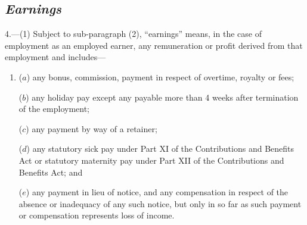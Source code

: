 \documentclass[12pt,a4paper]{article}
\begin{document}
\subsection*{\itshape Earnings}

4.---(1)  Subject to sub-paragraph (2), “earnings” means, in the case of employment as an employed earner, any remuneration or profit derived from that employment and includes—
\begin{enumerate}\item[]
($a$) any bonus, commission, payment in respect of overtime, royalty or fees;

($b$) any holiday pay except any payable more than 4 weeks after termination of the employment;

($c$) any payment by way of a retainer;

($d$) any statutory sick pay under Part XI of the Contributions and Benefits Act or statutory maternity pay under Part XII of the Contributions and Benefits Act; and

($e$) any payment in lieu of notice, and any compensation in respect of the absence or inadequacy of any such notice, but only in so far as such payment or compensation represents loss of income.
\end{enumerate}
\end{document}
